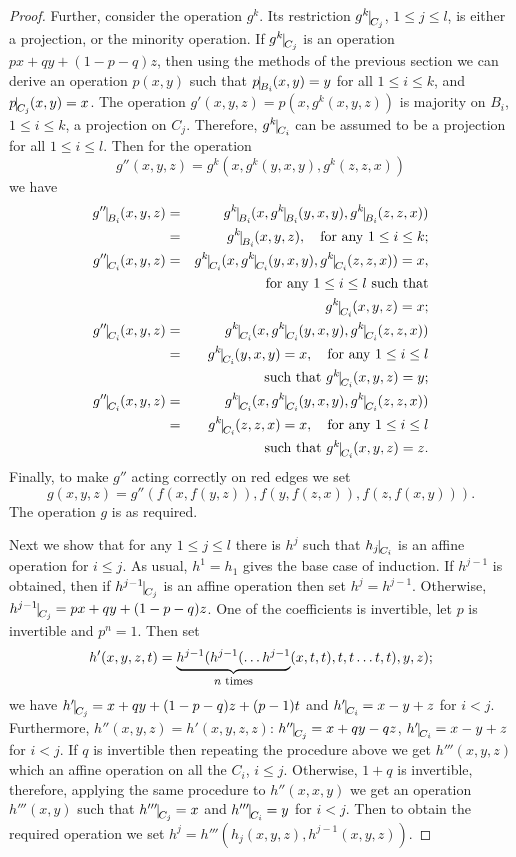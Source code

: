 \documentclass[11pt]{article}
\begin{document}
\begin{proof}
Further, consider the operation $g^k$. Its restriction $g^k\red{C_j}$,
$1\le j\le l$, is either a projection, or the minority operation. If
$g^k\red{C_j}$ is an operation $px+qy+(1-p-q)z$, then using the
methods of the previous section we can derive
an operation $p(x,y)$ such that $p\red{B_i}(x,y)=y$ for all $1\le i\le
k$, and $p\red{C_j}(x,y)=x$. The operation $g'(x,y,z)=p(x,g^k(x,y,z))$
is majority on $B_i$, $1\le i\le k$, a projection on $C_j$. Therefore,
$g^k\red{C_i}$ can be assumed to be a projection for all $1\le i\le
l$. Then for the operation  
$$
g''(x,y,z)=g^k(x,g^k(y,x,y),g^k(z,z,x))
$$
we have
\begin{eqnarray*}
g''\red{B_i}(x,y,z) &=& g^k\red{B_i}(x,g^k\red{B_i}(y,x,y),
g^k\red{B_i}(z,z,x))\\
&=& g^k\red{B_i}(x,y,z), \quad \hbox{for any $1\le i\le
k$};\\ 
g''\red{C_i}(x,y,z) &=& g^k\red{C_i}(x,g^k\red{C_i}(y,x,y),
g^k\red{C_i}(z,z,x))= x,\\
& & \ \hbox{for any $1\le i\le l$ such that}\\
& & g^k\red{C_i}(x,y,z)=x;\\ 
g''\red{C_i}(x,y,z) &=&
g^k\red{C_i}(x,g^k\red{C_i}(y,x,y),g^k\red{C_i}(z,z,x))\\
&=& g^k\red{C_i}(y,x,y)=x,\quad \hbox{for any $1\le i\le l$}\\
& & \quad \hbox{such that $g^k\red{C_i}(x,y,z)=y$};\\ 
g''\red{C_i}(x,y,z) &=&
g^k\red{C_i}(x,g^k\red{C_i}(y,x,y),g^k\red{C_i}(z,z,x))\\
&=& g^k\red{C_i}(z,z,x)=x,\quad \hbox{for any $1\le i\le l$}\\
& & \quad \hbox{such that $g^k\red{C_i}(x,y,z)=z$}.
\end{eqnarray*}
Finally, to make $g''$ acting correctly on red edges we set 
$$
g(x,y,z)=g''(f(x,f(y,z)),f(y,f(z,x)),f(z,f(x,y))).
$$
The operation $g$ is as required. 

Next we show that for any $1\le j\le l$ there is $h^j$ such that
$h_j\red{C_i}$ is an affine operation for $i\le j$. As usual,
$h^1=h_1$ gives the base case of induction. If $h^{j-1}$ is obtained,
then if $h^{j-1}\red{C_j}$ is an affine operation then set
$h^j=h^{j-1}$. Otherwise, $h^{j-1}\red{C_j}=px+qy+(1-p-q)z$. One of
the coefficients is invertible, let $p$ is invertible and
$p^n=1$. Then set 
$$
h'(x,y,z,t)=\underbrace{h^{j-1}(h^{j-1}(\ldots
h^{j-1}}_{\hbox{\footnotesize $n$ times}}(x,t,t),t,t\ldots t,t),y,z);
$$
we have $h'\red{C_j}=x+qy+(1-p-q)z+(p-1)t$ and $h'\red{C_i}=x-y+z$ for
$i<j$. Furthermore, $h''(x,y,z)=h'(x,y,z,z)$: $h''\red{C_j}=x+qy-qz$,
$h'\red{C_i}=x-y+z$ for $i<j$. If $q$ is invertible then repeating the
procedure above we get $h'''(x,y,z)$ which an affine operation on all
the $C_i$, $i\le j$. Otherwise, $1+q$ is invertible, therefore,
applying the same procedure to $h''(x,x,y)$ we get an operation
$h'''(x,y)$ such that $h'''\red{C_j}=x$ and $h'''\red{C_i}=y$ for
$i<j$. Then to obtain the required operation we set
$h^j=h'''(h_j(x,y,z),h^{j-1}(x,y,z))$. 


\end{proof}
\end{document}
